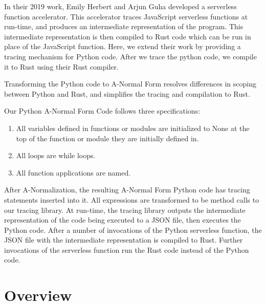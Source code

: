 \documentclass[acmsmall,review,authorversion]{acmart}
\begin{document}
In their 2019 work, Emily Herbert and Arjun Guha developed a serverless function accelerator. This accelerator traces JavaScript serverless functions at run-time, and produces an intermediate representation of the program. This intermediate representation is then compiled to Rust code which can be run in place of the JavaScript function. Here, we extend their work by providing a tracing mechanism for Python code. After we trace the python code, we compile it to Rust using their Rust compiler. 
 \par
 Transforming the Python code to A-Normal Form resolves differences in scoping between Python and Rust, and simplifies the tracing and compilation to Rust.
 \par
 Our Python A-Normal Form Code follows three specifications:
\begin{enumerate}
    \item All variables defined in functions or modules are initialized to None at the top of the function or module they are initially defined in. 
    \item All loops are while loops.
    \item All function applications are named.
\end{enumerate}
After A-Normalization, the resulting A-Normal Form Python code has tracing statements inserted into it. All expressions are transformed to be method calls to our tracing library. At run-time, the tracing library outputs the intermediate representation of the code being executed to a JSON file, then executes the Python code. After a number of invocations of the Python serverless function, the JSON file with the intermediate representation is compiled to Rust. Further invocations of the serverless function run the Rust code instead of the Python code. 

\section{Overview}
\end{document}
